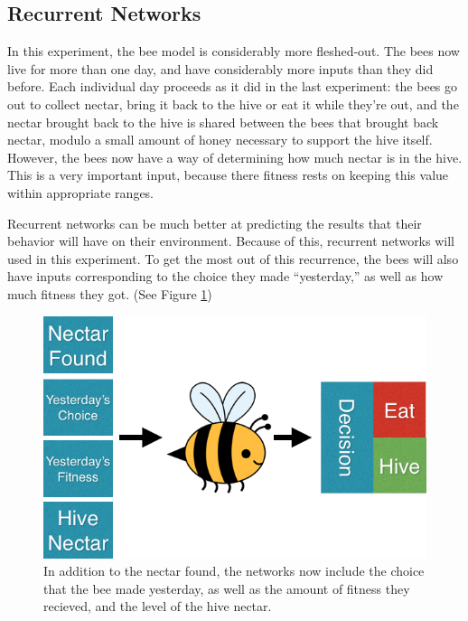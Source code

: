 \documentclass[11pt]{article}
\begin{document}
		\subsection{Recurrent Networks} %
		\label{sub:recurrent_networks}


			In this experiment, the bee model is considerably more fleshed-out. The bees now live for more than one day, and have considerably more inputs than they did before. Each individual day proceeds as it did in the last experiment: the bees go out to collect nectar, bring it back to the hive or eat it while they're out, and the nectar brought back to the hive is shared between the bees that brought back nectar, modulo a small amount of honey necessary to support the hive itself. However, the bees now have a way of determining how much nectar is in the hive. This is a very important input, because there fitness rests on keeping this value within appropriate ranges. 

			Recurrent networks can be much better at predicting the results that their behavior will have on their environment. Because of this, recurrent networks will used in this experiment. To get the most out of this recurrence, the bees will also have inputs corresponding to the choice they made ``yesterday,'' as well as how much fitness they got. (See Figure \ref{fig:recurrent_system})


			\begin{figure}[tb]
				\begin{center}
					\includegraphics[scale=.5]{bee_diagrams/recurrent_system.png}
				\end{center}
				\caption{In addition to the nectar found, the networks now include the choice that the bee made yesterday, as well as the amount of fitness they recieved, and the level of the hive nectar.}
				\label{fig:recurrent_system}
			\end{figure}
\end{document}
